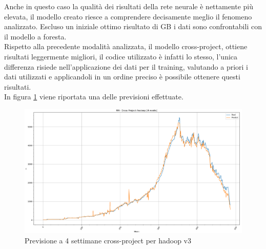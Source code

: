 \documentclass[%
    corpo=12pt,
    twoside,
    oldstyle,
    autoretitolo,
    greek,
    evenboxes,
]{toptesi}
\begin{document}
\begin{center}
   \label{tab:cross_project_hadoop}
\end{center}
Anche in questo caso la qualità dei risultati della rete neurale è nettamente più elevata, il modello creato riesce a comprendere decisamente meglio il fenomeno analizzato. Escluso un iniziale ottimo risultato di GB i dati sono confrontabili con il modello a foresta.\\
Rispetto alla precedente modalità analizzata, il modello cross-project, ottiene risultati leggermente migliori, il codice utilizzato è infatti lo stesso, l'unica differenza risiede nell'applicazione dei dati per il training, valutando a priori i dati utilizzati e applicandoli in un ordine preciso è possibile ottenere questi risultati.\\
In figura \ref{fig:hadoop_cp_nn_4w} viene riportata una delle previsioni effettuate.
\begin{figure}[!ht]
  \includegraphics[width=\linewidth]{figure/NN-CP-hadoop-4.png}
  \caption{Previsione a 4 settimane cross-project per hadoop v3}
  \label{fig:hadoop_cp_nn_4w}
\end{figure}
\end{document}
